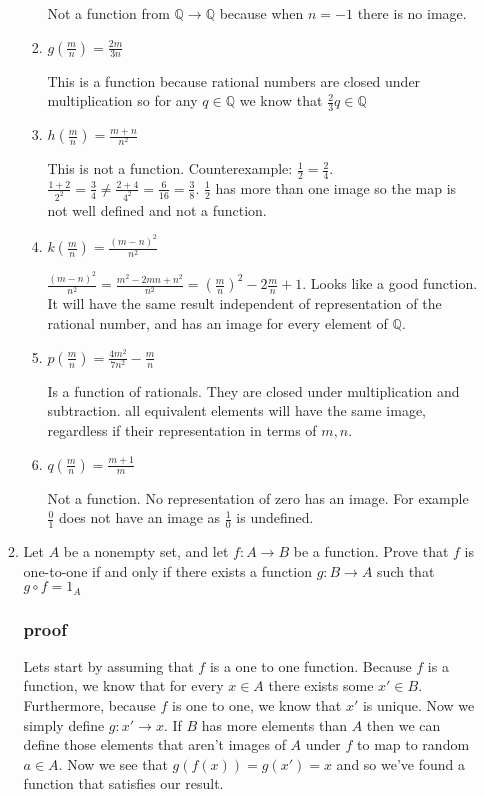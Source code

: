 \documentclass[letterpaper]{article}
\begin{document}
\begin{enumerate}
\begin{enumerate}
\begin{enumerate}
Not a function from $\mathbb{Q}\to\mathbb{Q}$ because when $n=-1$ there is no image.
\item
$\displaystyle g\left(\frac{m}{n}\right)=\frac{2m}{3n}$

This is a function because rational numbers are closed under multiplication so for any $q\in\mathbb{Q}$ we know that $\frac{2}{3}q\in\mathbb{Q}$
\item
$\displaystyle h\left(\frac{m}{n}\right)=\frac{m+n}{n^2}$

This is not a function. Counterexample: $\frac{1}{2}=\frac{2}{4}$. $\frac{1+2}{2^2}=\frac{3}{4}\ne\frac{2+4}{4^2}=\frac{6}{16}=\frac{3}{8}$. $\frac{1}{2}$ has more than one image so the map is not well defined and not a function.
\item
$\displaystyle k\left(\frac{m}{n}\right)=\frac{(m-n)^2}{n^2}$

$\displaystyle \frac{(m-n)^2}{n^2}=\frac{m^2-2mn+n^2}{n^2}=\left(\frac{m}{n}\right)^2-2\frac{m}{n}+1$. Looks like a good function. It will have the same result independent of representation of the rational number, and has an image for every element of $\mathbb{Q}$.
\item
$\displaystyle p\left(\frac{m}{n}\right)=\frac{4m^2}{7n^2}-\frac{m}{n}$

Is a function of rationals. They are closed under multiplication and subtraction. all equivalent elements will have the same image, regardless if their representation in terms of $m,n$.
\item
$\displaystyle q\left(\frac{m}{n}\right)=\frac{m+1}{m}$

Not a function. No representation of zero has an image. For example $\frac{0}{1}$ does not have an image as $\frac{1}{0}$ is undefined.
\end{enumerate}
\setcounter{enumii}{17}
\item
Let $A$ be a nonempty set, and let $f:A\to B$ be a function. Prove that $f$ is one-to-one if and only if there exists a function $g:B\to A$ such that $g\circ f=1_A$
\subsubsection*{proof}
Lets start by assuming that $f$ is a one to one function. Because $f$ is a function, we know that for every $x\in A$ there exists some $x'\in B$. Furthermore, because $f$ is one to one, we know that $x'$ is unique. Now we simply define $g:x'\to x$. If $B$ has more elements than $A$ then we can define those elements that aren't images of $A$ under $f$ to map to random $a\in A$. Now we see that $g(f(x))=g(x')=x$ and so we've found a function that satisfies our result.


\end{enumerate}
\end{enumerate}
\end{document}
